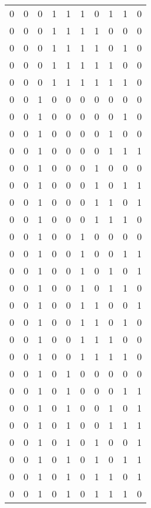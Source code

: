 \begin{longtable}[c]{rrrrrrrrrr}
        0 & 0 & 0 & 1 & 1 & 1 & 0 & 1 & 1 & 0 \\
        0 & 0 & 0 & 1 & 1 & 1 & 1 & 0 & 0 & 0 \\
        0 & 0 & 0 & 1 & 1 & 1 & 1 & 0 & 1 & 0 \\
        0 & 0 & 0 & 1 & 1 & 1 & 1 & 1 & 0 & 0 \\
        0 & 0 & 0 & 1 & 1 & 1 & 1 & 1 & 1 & 0 \\
        0 & 0 & 1 & 0 & 0 & 0 & 0 & 0 & 0 & 0 \\
        0 & 0 & 1 & 0 & 0 & 0 & 0 & 0 & 1 & 0 \\
        0 & 0 & 1 & 0 & 0 & 0 & 0 & 1 & 0 & 0 \\
        0 & 0 & 1 & 0 & 0 & 0 & 0 & 1 & 1 & 1 \\
        0 & 0 & 1 & 0 & 0 & 0 & 1 & 0 & 0 & 0 \\
        0 & 0 & 1 & 0 & 0 & 0 & 1 & 0 & 1 & 1 \\
        0 & 0 & 1 & 0 & 0 & 0 & 1 & 1 & 0 & 1 \\
        0 & 0 & 1 & 0 & 0 & 0 & 1 & 1 & 1 & 0 \\
        0 & 0 & 1 & 0 & 0 & 1 & 0 & 0 & 0 & 0 \\
        0 & 0 & 1 & 0 & 0 & 1 & 0 & 0 & 1 & 1 \\
        0 & 0 & 1 & 0 & 0 & 1 & 0 & 1 & 0 & 1 \\
        0 & 0 & 1 & 0 & 0 & 1 & 0 & 1 & 1 & 0 \\
        0 & 0 & 1 & 0 & 0 & 1 & 1 & 0 & 0 & 1 \\
        0 & 0 & 1 & 0 & 0 & 1 & 1 & 0 & 1 & 0 \\
        0 & 0 & 1 & 0 & 0 & 1 & 1 & 1 & 0 & 0 \\
        0 & 0 & 1 & 0 & 0 & 1 & 1 & 1 & 1 & 0 \\
        0 & 0 & 1 & 0 & 1 & 0 & 0 & 0 & 0 & 0 \\
        0 & 0 & 1 & 0 & 1 & 0 & 0 & 0 & 1 & 1 \\
        0 & 0 & 1 & 0 & 1 & 0 & 0 & 1 & 0 & 1 \\
        0 & 0 & 1 & 0 & 1 & 0 & 0 & 1 & 1 & 1 \\
        0 & 0 & 1 & 0 & 1 & 0 & 1 & 0 & 0 & 1 \\
        0 & 0 & 1 & 0 & 1 & 0 & 1 & 0 & 1 & 1 \\
        0 & 0 & 1 & 0 & 1 & 0 & 1 & 1 & 0 & 1 \\
        0 & 0 & 1 & 0 & 1 & 0 & 1 & 1 & 1 & 0 \\

\end{longtable}
